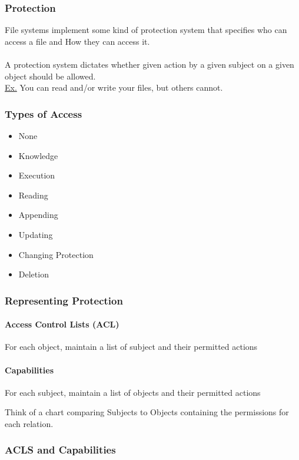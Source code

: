 \documentclass{article}
\begin{document}
\subsubsection{Protection}

File systems implement some kind of protection system that specifies who can access a file and How they can access it.
\\
\\
A protection system dictates whether given action by a given subject on a given object should be allowed.
\\
\underline{Ex.} You can read and\slash or write your files, but others cannot.

\subsubsection{Types of Access}

\begin{itemize}
    \item None
    \item Knowledge
    \item Execution
    \item Reading
    \item Appending
    \item Updating
    \item Changing Protection
    \item Deletion
\end{itemize}

\subsubsection{Representing Protection}

\paragraph{Access Control Lists (ACL)} For each object, maintain a list of subject and their permitted actions

\paragraph{Capabilities} For each subject, maintain a list of objects and their permitted actions

Think of a chart comparing Subjects to Objects containing the permissions for each relation.

\subsubsection{ACLS and Capabilities}
\end{document}
